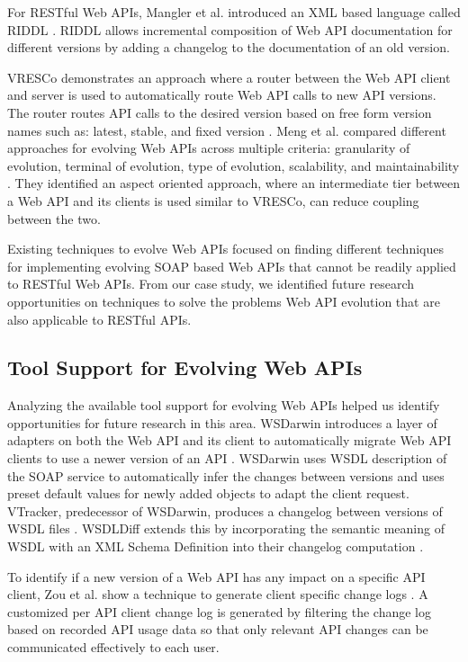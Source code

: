 For RESTful Web APIs, Mangler et al. introduced an XML based language called RIDDL \cite{mangler2010origin}. RIDDL allows incremental composition of Web API documentation for different versions by adding a changelog to the documentation of an old version.

VRESCo demonstrates an approach where a router between the Web API client and server is used to automatically route Web API calls to new API versions. The router routes API calls to the desired version based on free form version names such as: latest, stable, and fixed version \cite{leitner2008end}. Meng et al. compared different approaches for evolving Web APIs across multiple criteria: granularity of evolution, terminal of evolution, type of evolution, scalability, and maintainability \cite{6835564}. They identified an aspect oriented approach, where an intermediate tier between a Web API and its clients is used similar to VRESCo, can reduce coupling between the two.

Existing techniques to evolve Web APIs focused on finding different techniques for implementing evolving SOAP based Web APIs that cannot be readily applied to RESTful Web APIs. From our case study, we identified future research opportunities on techniques to solve the problems Web API evolution that are also applicable to RESTful APIs.

\subsection{Tool Support for Evolving Web APIs} %
\label{sub:tool_development}


Analyzing the available tool support for evolving Web APIs helped us identify opportunities for future research in this area. WSDarwin introduces a layer of adapters on both the Web API and its client to automatically migrate Web API clients to use a newer version of an API \cite{WSDarwin}. WSDarwin uses WSDL description of the SOAP service to automatically infer the changes between versions and uses preset default values for newly added objects to adapt the client request. VTracker, predecessor of WSDarwin, produces a changelog between versions of WSDL files \cite{fokaefs_2011_empirical}. WSDLDiff extends this by incorporating the semantic meaning of WSDL with an XML Schema Definition into their changelog computation \cite{wsdl_diff_2012}.

To identify if a new version of a Web API has any impact on a specific API client,  Zou et al. show a technique to generate client specific change logs \cite{le2008synchronizing}. A customized per API client change log is generated by filtering the change log based on  recorded API usage data so that only relevant API changes can be communicated effectively to each user.

